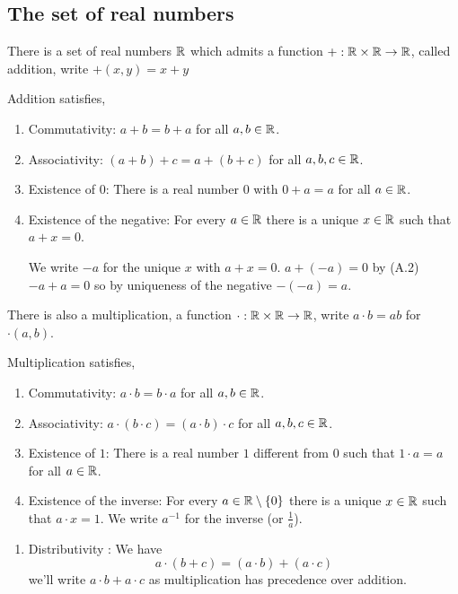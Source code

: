 \documentclass[10pt, a4paper]{article}
\begin{document}
\subsection{The set of real numbers}
There is a set of real numbers $\mathbb{R}$ which admits a function $+: \mathbb{R} \times \mathbb{R} \rightarrow \mathbb{R}$, called addition, write $+(x, y) = x + y$

Addition satisfies,
\begin{enumerate}[label = (A.\arabic*)]
    \item Commutativity: $a + b = b + a$ for all $a, b \in \mathbb{R}$.
    \item Associativity: $(a + b) + c = a + (b + c)$ for all $a, b, c \in \mathbb{R}$.
    \item Existence of $0$: There is a real number $0$ with $0 + a = a$ for all $a \in \mathbb{R}$.
    \item Existence of the negative: For every $a \in \mathbb{R}$ there is a unique $x \in \mathbb{R}$ such that $a + x = 0$.
    
    We write $-a$ for the unique $x$ with $a + x = 0$. $a + (-a) = 0$ by (A.2) $-a + a = 0$ so by uniqueness of the negative $-(-a) = a$.
\end{enumerate}

There is also a multiplication, a function $\cdot: \mathbb{R} \times \mathbb{R} \rightarrow \mathbb{R}$, write $a \cdot b = ab$ for $\cdot(a, b)$.

Multiplication satisfies,
\begin{enumerate}[label = (M.\arabic*)]
    \item Commutativity: $a \cdot b = b \cdot a$ for all $a, b \in \mathbb{R}$.
    \item Associativity: $a \cdot (b \cdot c) = (a \cdot b) \cdot c$ for all $a, b, c \in \mathbb{R}$.
    \item Existence of $1$: There is a real number $1$ different from $0$ such that $1 \cdot a = a$ for all $a \in \mathbb{R}$.
    \item Existence of the inverse: For every $a \in \mathbb{R} \setminus \{0\}$ there is a unique $x \in \mathbb{R}$ such that $a \cdot x = 1$. We write $a ^ {-1}$ for the inverse (or $\frac{1}{a}$).
\end{enumerate}
\begin{enumerate}[label = (D.\arabic*)]
    \item Distributivity : We have
    \[
    a \cdot (b + c) = (a \cdot b) + (a \cdot c)
    \]
    we'll write $a \cdot b + a\cdot c$ as multiplication has precedence over addition.
\end{enumerate}
\end{document}
